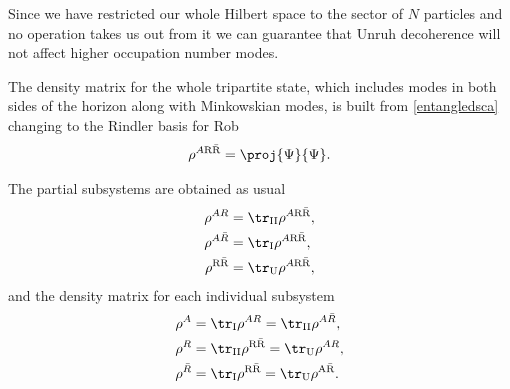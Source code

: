 Since we have restricted our whole Hilbert space to the sector of $N$ particles and no operation takes us out from it we can guarantee that Unruh decoherence will not affect higher occupation number modes.

The density matrix for the whole tripartite state, which includes modes in both sides of the horizon along with Minkowskian modes, is built from \eqref{entangledsca} changing to the Rindler basis for Rob
\begin{equation}\label{tripasca}
\rho^{A\text{R}{\bar{\text{R}}}}=\proj{\Psi}{\Psi}.
\end{equation}

The partial subsystems are obtained as usual
\begin{align}
\label{AR1}\rho^{AR}&=\tr_{\text{II}}\rho^{A\text{R}{\bar{\text{R}}}},\\*
\label{AAR1}\rho^{A\bar R}&=\tr_{\text{I}}\rho^{A\text{R}{\bar{\text{R}}}},\\*
\label{RAR1}\rho^{\text{R}{\bar{\text{R}}}}&=\tr_{\text{U}}\rho^{A\text{R}{\bar{\text{R}}}},
\end{align}
and the density matrix for each individual subsystem
 \begin{align}
\label{A1}\rho^{A}&=\tr_{\text{I}}\rho^{AR}=\tr_{\text{II}}\rho^{A\bar R},\\*
\label{R1}\rho^{R}&=\tr_{\text{II}}\rho^{\text{R}{\bar{\text{R}}}}=\tr_{\text{U}}\rho^{AR},\\*
\label{aR1}\rho^{\bar R}&=\tr_{\text{I}}\rho^{\text{R}{\bar{\text{R}}}}=\tr_{\text{U}}\rho^{\text{A}{\bar{\text{R}}}}.
\end{align}

